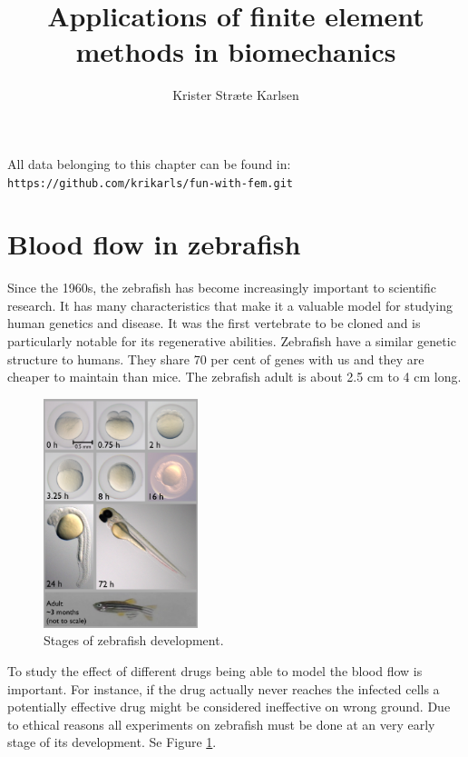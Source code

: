\documentclass[epsfig,11pt]{article}
\title{Applications of finite element methods in biomechanics}
\author{Krister Stræte Karlsen}
\begin{document}
\maketitle

All data belonging to this chapter can be found in: \\
{\color{Strings} \texttt{https://github.com/krikarls/fun-with-fem.git} }

\section{Blood flow in zebrafish}

Since the 1960s, the zebrafish has become increasingly important to scientific research. It has many characteristics that make it a valuable model for studying human genetics and disease. It was the first vertebrate to be cloned and is particularly notable for its regenerative abilities. Zebrafish have a similar genetic structure to humans. They share 70 per cent of genes with us and they are cheaper to maintain than mice. The zebrafish adult is about 2.5 cm to 4 cm long. 

\begin{figure}
  \begin{center}
    \includegraphics[width=0.4\textwidth]{zebrafish.png}
  \end{center}
  \caption{Stages of zebrafish development.}
      \label{fig:zebrafisk_development}
\end{figure}

To study the effect of different drugs being able to model the blood flow is important. For instance, if the drug actually never reaches the infected cells a potentially effective drug might be considered ineffective on wrong ground. Due to ethical reasons all experiments on zebrafish must be done at an very early stage of its development. Se Figure \ref{fig:zebrafisk_development}.
\end{document}

